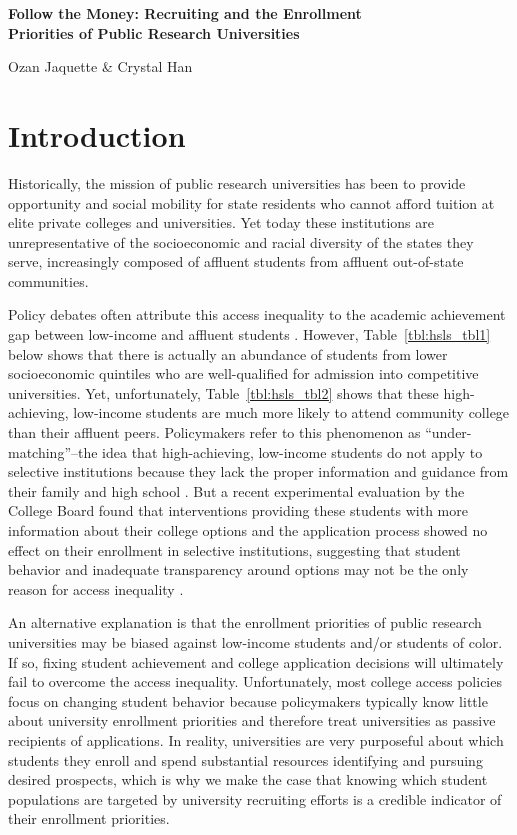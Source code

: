 \documentclass{article}
\begin{document}
\sloppy




{\LARGE\noindent\bfseries Follow the Money: Recruiting and the Enrollment \\Priorities of Public Research Universities}

{\noindent\large Ozan Jaquette \& Crystal Han}

\section*{Introduction}

Historically, the mission of public research universities has been to provide opportunity and social mobility for state residents who cannot afford tuition at elite private colleges and universities. Yet today these institutions are unrepresentative of the socioeconomic and racial diversity of the states they serve, increasingly composed of affluent students from affluent out-of-state communities.

Policy debates often attribute this access inequality to the academic achievement gap between low-income and affluent students \citep{RN4016}. However, Table~\ref{tbl:hsls_tbl1} below shows that there is actually an abundance of students from lower socioeconomic quintiles who are well-qualified for admission into competitive universities. Yet, unfortunately, Table~\ref{tbl:hsls_tbl2} shows that these high-achieving, low-income students are much more likely to attend community college than their affluent peers. Policymakers refer to this phenomenon as ``under-matching''--the idea that high-achieving, low-income students do not apply to selective institutions because they lack the proper information and guidance from their family and high school \citep{RN3699}. But a recent experimental evaluation by the College Board found that interventions providing these students with more information about their college options and the application process showed no effect on their enrollment in selective institutions, suggesting that student behavior and inadequate transparency around options may not be the only reason for access inequality \citep{RN4468}.

An alternative explanation is that the enrollment priorities of public research universities may be biased against low-income students and/or students of color. If so, fixing student achievement and college application decisions will ultimately fail to overcome the access inequality. Unfortunately, most college access policies focus on changing student behavior because policymakers typically know little about university enrollment priorities and therefore treat universities as passive recipients of applications. In reality, universities are very purposeful about which students they enroll and spend substantial resources identifying and pursuing desired prospects, which is why we make the case that knowing which student populations are targeted by university recruiting efforts is a credible indicator of their enrollment priorities. 
\end{document}
